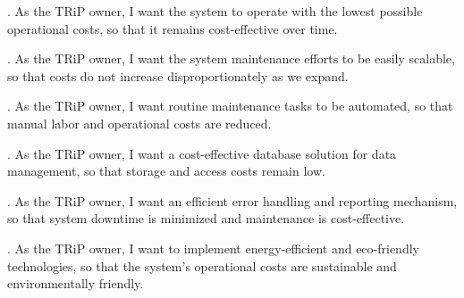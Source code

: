 . As the TRiP owner, I want the system to operate with the lowest possible operational costs, so that it remains cost-effective over time.

. As the TRiP owner, I want the system maintenance efforts to be easily scalable, so that costs do not increase disproportionately as we expand.

. As the TRiP owner, I want routine maintenance tasks to be automated, so that manual labor and operational costs are reduced.

. As the TRiP owner, I want a cost-effective database solution for data management, so that storage and access costs remain low.

. As the TRiP owner, I want an efficient error handling and reporting mechanism, so that system downtime is minimized and maintenance is cost-effective.

. As the TRiP owner, I want to implement energy-efficient and eco-friendly technologies, so that the system's operational costs are sustainable and environmentally friendly.


